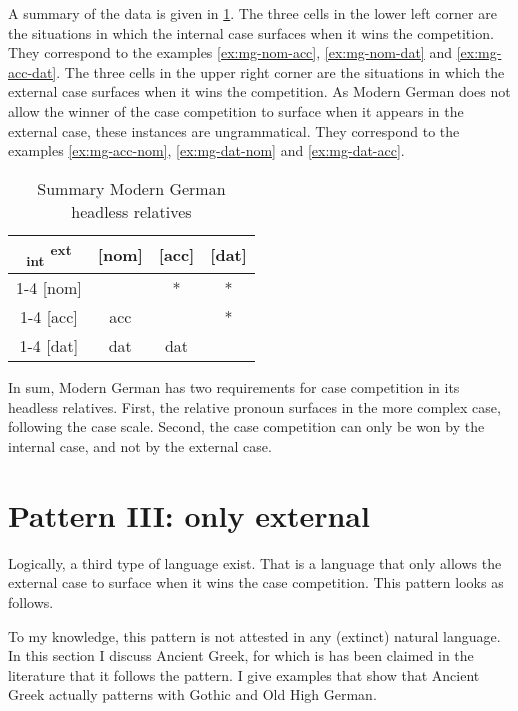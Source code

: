 A summary of the data is given in \ref{tbl:summary-modern-german}.
The three cells in the lower left corner are the situations in which the internal case surfaces when it wins the competition. They correspond to the examples \ref{ex:mg-nom-acc}, \ref{ex:mg-nom-dat} and \ref{ex:mg-acc-dat}.
The three cells in the upper right corner are the situations in which the external case surfaces when it wins the competition. As Modern German does not allow the winner of the case competition to surface when it appears in the external case, these instances are ungrammatical. They correspond to the examples \ref{ex:mg-acc-nom}, \ref{ex:mg-dat-nom} and \ref{ex:mg-dat-acc}.

\begin{table}[H]
  \center
  \caption{Summary Modern German headless relatives}
  \begin{tabular}{c|c|c|c}
    \toprule
   \textsubscript{\ac{int}} \textsuperscript{\ac{ext}}
          & [\ac{nom}]
          & [\ac{acc}]
          & [\ac{dat}]
          \\ \cmidrule{1-4}
      [\ac{nom}]
          &
          & *
          & *
          \\ \cmidrule{1-4}
      [\ac{acc}]
          & \ac{acc}
          &
          & *
          \\ \cmidrule{1-4}
      [\ac{dat}]
          & \ac{dat}
          & \ac{dat}
          &
          \\
    \bottomrule
  \end{tabular}
  \label{tbl:summary-modern-german}
\end{table}

In sum, Modern German has two requirements for case competition in its headless relatives. First, the relative pronoun surfaces in the more complex case, following the case scale. Second, the case competition can only be won by the internal case, and not by the external case.

\section{Pattern III: only external}\label{sec:pattern-iii}

Logically, a third type of language exist. That is a language that only allows the external case to surface when it wins the case competition. This pattern looks as follows.



To my knowledge, this pattern is not attested in any (extinct) natural language. In this section I discuss Ancient Greek, for which is has been claimed in the literature that it follows the pattern. I give examples that show that Ancient Greek actually patterns with Gothic and Old High German.

